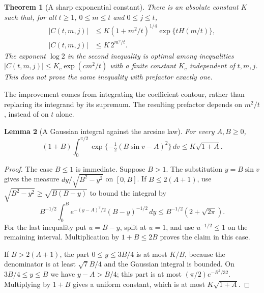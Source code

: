 \documentclass[11pt,a4paper]{article}
\newtheorem{theorem}{Theorem}[section]
\newtheorem{lemma}[theorem]{Lemma}
\theoremstyle{definition}
\theoremstyle{remark}
\numberwithin{equation}{section}
\begin{document}
\begin{theorem}[A sharp exponential constant]\label{E:cbx:main}
There is an absolute constant $K$ such that, for all
$t\ge1$, $0\le m\le t$ and $0\le j\le t$,
\begin{align}
 |C(t,m,j)|&\le K(1+m^2/t)^{1/4}\exp\{tH(m/t)\},
                                      \label{E:cbx:profileupper}\\
 |C(t,m,j)|&\le K\,2^{m^2/t}.           \label{E:cbx:optimalupper}
\end{align}
The exponent $\log2$ in the second inequality is optimal among
inequalities $|C(t,m,j)|\le K_c\exp(c m^2/t)$ with a finite constant
$K_c$ independent of $t,m,j$. This does not prove the same inequality
with prefactor exactly one.
\end{theorem}

The improvement comes from integrating the coefficient contour,
rather than replacing its integrand by its supremum. The resulting
prefactor depends on $m^2/t$, instead of on $t$ alone.

\begin{lemma}[A Gaussian integral against the arcsine law]
\label{E:cbx:arcsine}
For every $A,B\ge0$,
\[
 (1+B)\int_0^{\pi/2}
       \exp\{-\tfrac12(B\sin v-A)^2\}\,dv
       \le K\sqrt{1+A}.
\]
\end{lemma}
\begin{proof}
The case $B\le1$ is immediate. Suppose $B>1$. The substitution
$y=B\sin v$ gives the measure $dy/\sqrt{B^2-y^2}$ on $[0,B]$.
If $B\le2(A+1)$, use
$\sqrt{B^2-y^2}\ge\sqrt{B(B-y)}$ to bound the integral by
\[
 B^{-1/2}\int_0^B e^{-(y-A)^2/2}(B-y)^{-1/2}\,dy
 \le B^{-1/2}(2+\sqrt{2\pi}).
\]
For the last inequality put $u=B-y$, split at $u=1$, and use
$u^{-1/2}\le1$ on the remaining interval. Multiplication by
$1+B\le2B$ proves the claim in this case.

If $B>2(A+1)$, the part $0\le y\le3B/4$ is at most $K/B$,
because the denominator is at least $\sqrt7 B/4$ and the Gaussian
integral is bounded. On $3B/4\le y\le B$ we have $y-A>B/4$;
this part is at most $(\pi/2)e^{-B^2/32}$. Multiplying by
$1+B$ gives a uniform constant, which is at most
$K\sqrt{1+A}$.
\end{proof}
\end{document}
